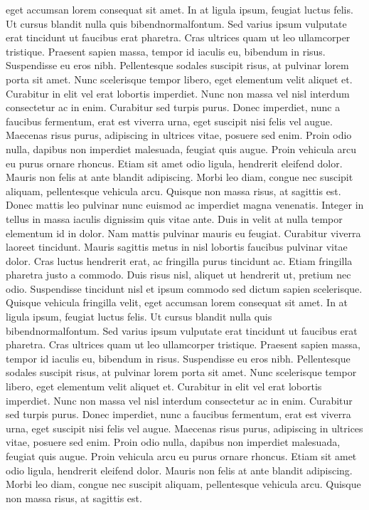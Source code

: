 \documentclass[letterpaper, twoside, 12pt,these,creativecommons,hyperref]{thETS}
\begin{document}
\begin{introduction}
eget accumsan lorem consequat sit amet. In at ligula ipsum, feugiat luctus felis. Ut cursus blandit nulla quis bibendnormalfontum. Sed varius ipsum vulputate erat tincidunt ut faucibus erat pharetra. Cras ultrices quam ut leo ullamcorper tristique. Praesent sapien massa, tempor id iaculis eu, bibendum in risus. Suspendisse eu eros nibh. Pellentesque sodales suscipit risus, at pulvinar lorem porta sit amet. Nunc scelerisque tempor libero, eget elementum velit aliquet et. Curabitur in elit vel erat lobortis imperdiet. Nunc non massa vel nisl interdum consectetur ac in enim. Curabitur sed turpis purus. Donec imperdiet, nunc a faucibus fermentum, erat est viverra urna, eget suscipit nisi felis vel augue. Maecenas risus purus, adipiscing in ultrices vitae, posuere sed enim. Proin odio nulla, dapibus non imperdiet malesuada, feugiat quis augue. Proin vehicula arcu eu purus ornare rhoncus. Etiam sit amet odio ligula, hendrerit eleifend dolor. Mauris non felis at ante blandit adipiscing. Morbi leo diam, congue nec suscipit aliquam, pellentesque vehicula arcu. Quisque non massa risus, at sagittis est. Donec mattis leo pulvinar nunc euismod ac imperdiet magna venenatis. Integer in tellus in massa iaculis dignissim quis vitae ante. Duis in velit at nulla tempor elementum id in dolor. Nam mattis pulvinar mauris eu feugiat. Curabitur viverra laoreet tincidunt. Mauris sagittis metus in nisl lobortis faucibus pulvinar vitae dolor. Cras luctus hendrerit erat, ac fringilla purus tincidunt ac. Etiam fringilla pharetra justo a commodo. Duis risus nisl, aliquet ut hendrerit ut, pretium nec odio. Suspendisse tincidunt nisl et ipsum commodo sed dictum sapien scelerisque. Quisque vehicula fringilla velit, eget accumsan lorem consequat sit amet. In at ligula ipsum, feugiat luctus felis. Ut cursus blandit nulla quis bibendnormalfontum. Sed varius ipsum vulputate erat tincidunt ut faucibus erat pharetra. Cras ultrices quam ut leo ullamcorper tristique. Praesent sapien massa, tempor id iaculis eu, bibendum in risus. Suspendisse eu eros nibh. Pellentesque sodales suscipit risus, at pulvinar lorem porta sit amet. Nunc scelerisque tempor libero, eget elementum velit aliquet et. Curabitur in elit vel erat lobortis imperdiet. Nunc non massa vel nisl interdum consectetur ac in enim. Curabitur sed turpis purus. Donec imperdiet, nunc a faucibus fermentum, erat est viverra urna, eget suscipit nisi felis vel augue. Maecenas risus purus, adipiscing in ultrices vitae, posuere sed enim. Proin odio nulla, dapibus non imperdiet malesuada, feugiat quis augue. Proin vehicula arcu eu purus ornare rhoncus. Etiam sit amet odio ligula, hendrerit eleifend dolor. Mauris non felis at ante blandit adipiscing. Morbi leo diam, congue nec suscipit aliquam, pellentesque vehicula arcu. Quisque non massa risus, at sagittis est.


\end{introduction}
\end{document}
